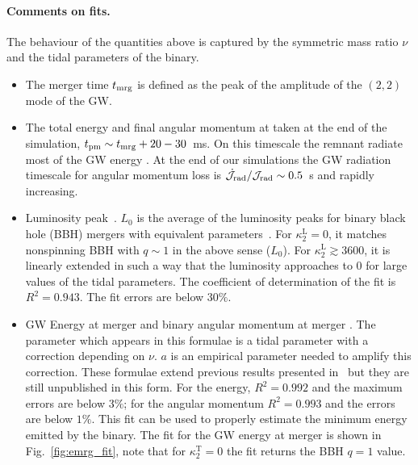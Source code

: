 \documentclass[aps,prl,onecolumn,superscriptaddress,groupedaddress,nofootinbib,floatfix,notitlepage]{revtex4-1}
\newcommand{\stext}[1]{\text{#1}}
\newcommand{\red}[1]{\textcolor{red}{#1}}
\begin{document}
\paragraph*{\bf Comments on fits.}
The behaviour of the quantities above is captured by the symmetric mass ratio $\nu$
and the tidal parameters of the binary.
\begin{itemize}

\item The merger time $t_{\rm mrg}$ is defined as the peak of the amplitude of the $(2,2)$ mode of the GW.

\item The total energy and final angular momentum at taken at the end
  of the simulation, $t_{\rm pm}\sim t_{\rm mrg} + 20-30$~ms. On this
  timescale the remnant radiate most of the GW energy
  \cite{Bernuzzi:2015opx}. At the end of our simulations the GW
  radiation timescale for angular momentum loss is $\dot{{\cal
      J}}_\stext{rad}/{\cal J}_\stext{rad}\sim 0.5$~s and rapidly increasing.

\item Luminosity peak~\cite{Zappa:2017xba}.
  $L_0$ is the average of the luminosity peaks for binary black hole
  (BBH) 
  mergers with equivalent parameters~\cite{Keitel:2016krm}.
  For $\kappa^\text{L}_2 = 0 $, it matches nonspinning BBH
  with $q\sim1$ in the above sense ($L_0$).
  For $\kappa^\text{L}_2 \gtrsim 3600 $, it is linearly extended in
  such a way that the luminosity approaches to 0 for large values 
  of the tidal parameters.
  The coefficient of determination of the fit is $R^2 = 0.943$. The
  fit errors are below $30 \%$.
  
\item GW Energy at merger and binary angular momentum at merger \cite{Bernuzzi:2014kca,Zappa:2017xba}. The parameter which appears in this formulae is a tidal parameter
  with a correction depending on $\nu$. $a$ is an empirical parameter needed to amplify this correction.
  These formulae extend previous results presented in~\cite{Bernuzzi:2014kca} but they are still unpublished in this form. 
  For the energy, $R^2 = 0.992$ and the maximum errors are below $3\%$; for the angular momentum $R^2 = 0.993$ and the errors are 
  below $1\%$. This fit can be used to properly estimate the minimum
  energy emitted by the binary. The fit for the GW energy at merger is shown in Fig.~\ref{fig:emrg_fit}, note that 
  for $\kappa_2^\stext{T}=0$ the fit returns the BBH $q=1$ value.


\end{itemize}
\end{document}
